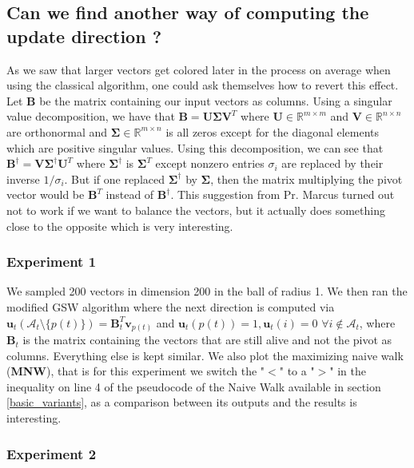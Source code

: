 \documentclass[12pt]{article}
\begin{document}
\subsection{Can we find another way of computing the update direction ?}
 As we saw that larger vectors get colored later in the process on average when using the classical algorithm, one could ask themselves how to revert this effect. Let $\textbf{B}$ be the matrix containing our input vectors as columns. Using a singular value decomposition, we have that $\textbf{B}=\textbf{U}\bm{\Sigma}\textbf{V}^T$ where $\textbf{U}\in\mathbb{R}^{m\times m}$ and $\textbf{V}\in\mathbb{R}^{n\times n}$ are orthonormal and $\bm{\Sigma}\in\mathbb{R}^{m\times n}$ is all zeros except for the diagonal elements which are positive singular values. Using this decomposition, we can see that $\textbf{B}^\dagger=\textbf{V}\bm{\Sigma}^\dagger\textbf{U}^T$ where $\bm{\Sigma}^\dagger$ is $\bm{\Sigma}^T$ except nonzero entries $\sigma_i$ are replaced by their inverse $1/\sigma_i$. But if one replaced $\bm{\Sigma}^\dagger$ by $\bm{\Sigma}$, then the matrix multiplying the pivot vector would be $\textbf{B}^T$ instead of $\textbf{B}^\dagger$. This suggestion from Pr. Marcus turned out not to work if we want to balance the vectors, but it actually does something close to the opposite which is very interesting. 

\subsubsection{Experiment 1}\label{exp1_A_T}

We sampled 200 vectors in dimension 200 in the ball of radius 1. We then ran the modified GSW algorithm where the next direction is computed via $\textbf{u}_t(\mathcal{A}_t\setminus\{p(t)\})=\textbf{B}_t^T\textbf{v}_{p(t)}$ and $\textbf{u}_t(p(t))=1, \textbf{u}_t(i)=0$ $\forall i\not\in\mathcal{A}_t$, where $\textbf{B}_t$ is the matrix containing the vectors that are still alive and not the pivot as columns. Everything else is kept similar. We also plot the maximizing naive walk (\textbf{MNW}), that is for this experiment we switch the "$<$" to a "$>$" in the inequality on line 4 of the pseudocode of the Naive Walk available in section \ref{basic_variants}, as a comparison between its outputs and the results is interesting.

\subsubsection{Experiment 2}\label{exp2_A_T}
\end{document}
